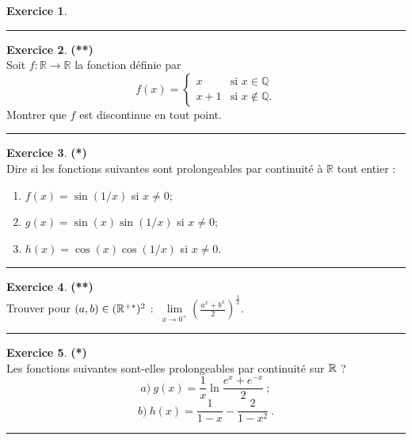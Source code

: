 \documentclass[a4paper,11pt]{article}
\theoremstyle{definition}
\newtheorem{exo}{Exercice} %
\begin{document}
\begin{minipage}[t]{1\linewidth}
\begin{minipage}[t]{0.48\linewidth}
\begin{exo}
		
	\centering
		\rule{1\linewidth}{0.6pt}
	\end{exo}
	
	
	
	\begin{exo}\textbf{(**)}\quad\\[0.2cm]
	 	Soit $f:\mathbb R\to\mathbb R$ la fonction définie par 
	 	$$f(x)=\left\{
	 	\begin{array}{cl}
	 	x&\textrm{si }x\in\mathbb Q\\
	 	x+1&\textrm{si }x\notin \mathbb Q.
	 	\end{array}\right.$$
	 	Montrer que $f$ est discontinue en tout point.
	 	
	 	
		\centering
\rule{1\linewidth}{0.6pt}
\end{exo}

	\begin{exo}\textbf{(*)}\quad\\[0.2cm]
	Dire si les fonctions suivantes sont prolongeables par continuité à $\mathbb R$ tout entier :
	\begin{enumerate}
		\item $f(x)=\sin(1/x)$ si $x\neq 0$;
		\item $g(x)=\sin(x)\sin(1/x)$ si $x\neq 0$;
		\item $h(x)=\cos(x)\cos(1/x)$ si $x\neq 0$.
	\end{enumerate}
	
	\centering
	\rule{1\linewidth}{0.6pt}
\end{exo}

		\begin{exo}\textbf{(**)}\quad\\[0.2cm]
	Trouver pour $(a,b)\in (\mathbb{R}^{+*})^{2}$ :\ $\lim\limits_{x\rightarrow 0^{+}}\left(\frac{a^{x}+b^{x}}{2}\right)^{\frac{1}{x}}.$
	
	\centering
	\rule{1\linewidth}{0.6pt}
\end{exo}




\end{minipage}	
\hfill\vrule\hfill
\begin{minipage}[t]{0.48\linewidth}
\raggedright


	\begin{exo}\textbf{(*)}\quad\\[0.2cm]
Les fonctions suivantes sont-elles prolongeables par continuit\'e sur
$\mathbb{R}$ ?
$$a)\ g(x)=\frac{1}{x}\ln\frac{e^x+e^{-x}}{2}\ ;$$
$$b)\ h(x)=\frac{1}{1-x}-\frac{2}{1-x^2}\ .$$
		
		\centering
		\rule{1\linewidth}{0.6pt}
	\end{exo}
	

\end{minipage}
\end{minipage}
\end{document}
